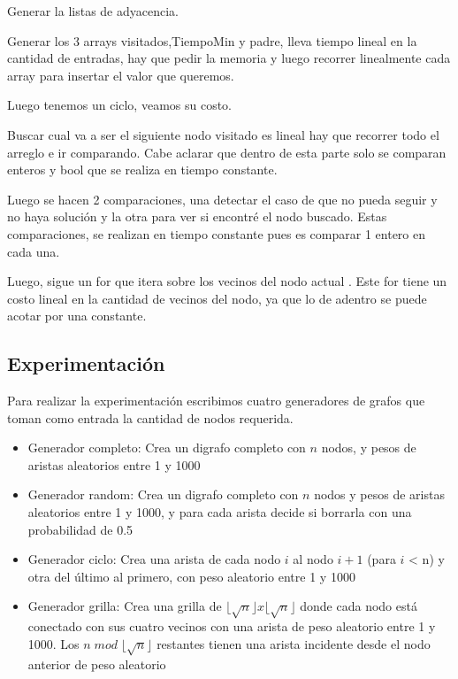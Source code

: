 Generar la listas de adyacencia.

Generar los 3 arrays visitados,TiempoMin y padre, lleva tiempo lineal en la cantidad de entradas, hay que pedir la memoria y luego recorrer linealmente cada array para insertar el valor que queremos.

Luego tenemos un ciclo,  veamos su costo.

Buscar cual va a ser el siguiente nodo visitado es lineal hay que recorrer todo el arreglo e ir comparando. Cabe aclarar que dentro de esta parte solo se comparan enteros y bool que se realiza en tiempo constante.

Luego se hacen 2 comparaciones, una detectar el caso de que no pueda seguir y no haya solución y la otra para ver si encontré el nodo buscado. Estas comparaciones, se realizan en tiempo constante pues es comparar 1 entero en cada una.

Luego,  sigue un for que itera sobre los vecinos del nodo actual . Este for tiene un costo lineal en la cantidad de vecinos del nodo, ya que lo de adentro se puede acotar por una constante.


\subsection{Experimentación}

Para realizar la experimentación escribimos cuatro generadores de grafos que toman como entrada la cantidad de nodos requerida.

\begin{itemize}

    \item Generador completo: Crea un digrafo completo con $n$ nodos, y pesos de aristas aleatorios entre 1 y 1000

    \item Generador random: Crea un digrafo completo con $n$ nodos y pesos de aristas aleatorios entre 1 y 1000, y para cada arista decide si borrarla con una probabilidad de 0.5

    \item Generador ciclo: Crea una arista de cada nodo $i$ al nodo $i+1$ (para $i$ < n) y otra del último al primero, con peso aleatorio entre 1 y 1000

    \item Generador grilla: Crea una grilla de $\lfloor \sqrt{n} \rfloor x \lfloor \sqrt{n} \rfloor$ donde cada nodo está conectado con sus cuatro vecinos con una arista de peso aleatorio entre 1 y 1000. Los $n \; mod \; \lfloor \sqrt{n} \rfloor$ restantes tienen una arista incidente desde el nodo anterior de peso aleatorio

\end{itemize}

